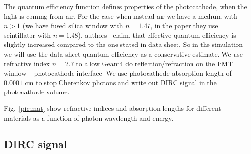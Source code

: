 \documentclass[11pt, a4paper]{article}
\begin{document}
The quantum efficiency function defines properties of the photocathode, when the light is coming from air. For the case when instead air we have a medium with $n > 1$ (we have fused silica window with $n = 1.47$, in the paper they use scintillator with $n = 1.48$), authors~\cite{pcpaper} claim, that effective quantum efficiency is slightly increased compared to the one stated in data sheet. So in the simulation we will use the data sheet quantum efficiency as a conservative estimate. We use refractive index $n = 2.7$ to allow Geant4 do reflection/refraction on the PMT window -- photocathode interface. We use photocathode absorption length of $0.0001$ cm to stop Cherenkov photons and write out DIRC signal in the photocathode volume.




Fig.~\ref{pic:mat} show refractive indices and absorption lengths for different materials as a function of photon wavelength and energy.

\subsection{DIRC signal}
\end{document}
